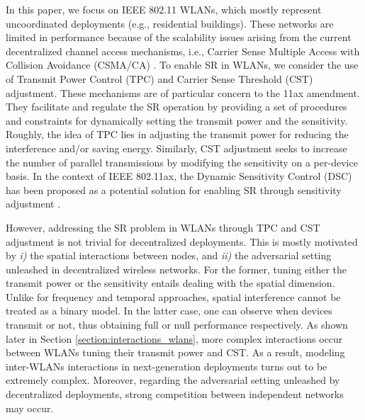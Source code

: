 \documentclass{article}
\begin{document}
In this paper, we focus on IEEE 802.11 WLANs, which mostly represent uncoordinated deployments (e.g., residential buildings). These networks are limited in performance because of the scalability issues arising from the current decentralized channel access mechanisms, i.e., Carrier Sense Multiple Access with Collision Avoidance (CSMA/CA) \cite{ergin2007understanding}. To enable SR in WLANs, we consider the use of Transmit Power Control (TPC) and Carrier Sense Threshold (CST) adjustment. These mechanisms are of particular concern to the 11ax amendment. They facilitate and regulate the SR operation by providing a set of procedures and constraints for dynamically setting the transmit power and the sensitivity. Roughly, the idea of TPC lies in adjusting the transmit power for reducing the interference and/or saving energy. Similarly, CST adjustment seeks to increase the number of parallel transmissions by modifying the sensitivity on a per-device basis. In the context of IEEE 802.11ax, the Dynamic Sensitivity Control (DSC) has been proposed as a potential solution for enabling SR through sensitivity adjustment \cite{smith2015dynamic}.

However, addressing the SR problem in WLANs through TPC and CST adjustment is not trivial for decentralized deployments. This is mostly motivated by \emph{i)} the spatial interactions between nodes, and \emph{ii)} the adversarial setting unleashed in decentralized wireless networks. For the former, tuning either the transmit power or the sensitivity entails dealing with the spatial dimension. Unlike for frequency and temporal approaches, spatial interference cannot be treated as a binary model. In the latter case, one can observe when devices transmit or not, thus obtaining full or null performance respectively. As shown later in Section \ref{section:interactions_wlans}, more complex interactions occur between WLANs tuning their transmit power and CST. As a result, modeling inter-WLANs interactions in next-generation deployments turns out to be extremely complex. Moreover, regarding the adversarial setting unleashed by decentralized deployments, strong competition between independent networks may occur. 
\end{document}
